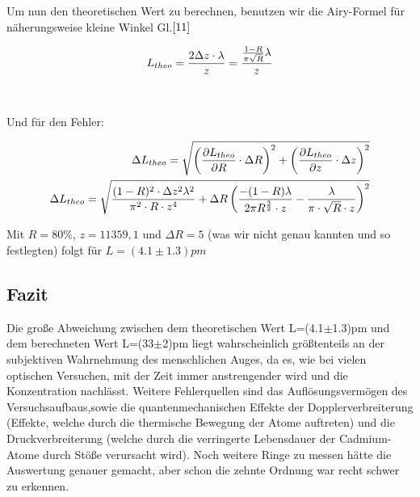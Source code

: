 Um nun den theoretischen Wert zu berechnen, benutzen wir die Airy-Formel für näherungsweise kleine Winkel Gl.$\eqref{11}$

\begin{equation}\notag
L_{theo}=\frac{2 \Delta z\cdot \lambda}{z}=\frac{\frac {1-R}{\pi \sqrt {R}}\lambda}{z} 
\end{equation}\\
\\
Und für den Fehler:

\begin{equation}\notag
\begin{split}
\Delta L_{theo}=\sqrt{\left(\frac{\partial L_{theo}}{\partial R}\cdot \Delta R\right)^2+\left(\frac{\partial L_{theo}}{\partial z}\cdot \Delta z\right)^2}\\
\Delta L_{theo}=\sqrt{\frac{(1-R)^2\cdot\Delta z^2\lambda^2}{\pi^2\cdot R\cdot z^4}+\Delta R\left(\frac{-(1-R)\lambda}{2\pi R^{\frac{3}{2}}\cdot z}-\frac{\lambda}{\pi \cdot \sqrt{R}\cdot z}\right)^2}
\end{split}
\end{equation}

Mit $R=80\%$, $z=11359,1$ und $\Delta R=5$ (was wir nicht genau kannten und so festlegten) folgt für $L=(4.1\pm 1.3)pm$

\subsection{Fazit}
Die große Abweichung zwischen dem theoretischen Wert L=(4.1$\pm$1.3)pm und dem berechneten Wert L=(33$\pm$2)pm liegt wahrscheinlich größtenteils an der subjektiven Wahrnehmung des menschlichen Auges, da es, wie bei vielen optischen Versuchen, mit der Zeit immer anstrengender wird und die Konzentration nachlässt. Weitere Fehlerquellen sind das Auflösungsvermögen des Versuchsaufbaus,sowie die quantenmechanischen Effekte der Dopplerverbreiterung (Effekte, welche durch die thermische Bewegung der Atome auftreten) und die Druckverbreiterung (welche durch die verringerte Lebensdauer der Cadmium-Atome durch Stöße verursacht wird).
Noch weitere Ringe zu messen hätte die Auswertung genauer gemacht, aber schon die zehnte Ordnung war recht schwer zu erkennen.